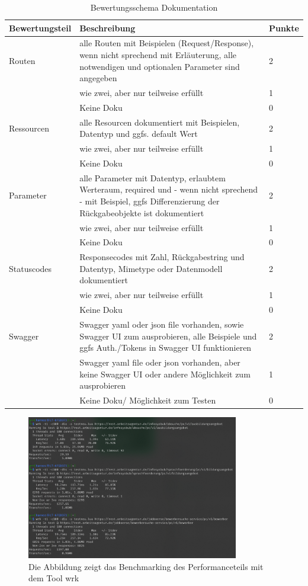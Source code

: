 \documentclass[notitlepage, hidelinks]{article}
\begin{document}
\begin{table}[H]
\begin{center}
\begin{tabular}{|p{3.6cm}|p{8.5cm}|p{2.5cm}|}
\hline
\textbf{Bewertungsteil} & \textbf{Beschreibung} & \textbf{Punkte}\\ \hline
Routen & alle Routen mit Beispielen (Request/Response), wenn nicht sprechend mit Erläuterung, alle notwendigen und optionalen Parameter sind angegeben & 2 \\ \hline
& wie zwei, aber nur teilweise erfüllt & 1 \\ \hline
& Keine Doku & 0 \\ \hline
Ressourcen & alle Resourcen dokumentiert mit Beispielen, Datentyp und ggfs. default Wert & 2 \\ \hline
& wie zwei, aber nur teilweise erfüllt & 1 \\ \hline
& Keine Doku & 0 \\ \hline
Parameter & alle Parameter mit Datentyp, erlaubtem Werteraum, required und - wenn nicht sprechend - mit Beispiel, ggfs Differenzierung der Rückgabeobjekte ist dokumentiert & 2 \\ \hline
& wie zwei, aber nur teilweise erfüllt & 1 \\ \hline
& Keine Doku & 0 \\ \hline
Statuscodes & Responsecodes mit Zahl, Rückgabestring und Datentyp, Mimetype oder Datenmodell dokumentiert & 2 \\ \hline
& wie zwei, aber nur teilweise erfüllt & 1 \\ \hline
& Keine Doku & 0 \\ \hline
Swagger & Swagger yaml oder json file vorhanden, sowie Swagger UI zum ausprobieren, alle Beispiele und ggfs Auth./Tokens in Swagger UI funktionieren & 2 \\ \hline
& Swagger yaml file oder json vorhanden, aber keine Swagger UI oder andere Möglichkeit zum ausprobieren & 1 \\ \hline
& Keine Doku/ Möglichkeit zum Testen & 0 \\ \hline
\end{tabular}
\caption{Bewertungsschema Dokumentation}
\label{documentation}
\end{center}
\end{table}


\begin{figure}[H]
\centering
  \includegraphics[width=350px]{images/apisbenchmarking.png}
  \caption{Die Abbildung zeigt das Benchmarking des Performanceteils mit dem Tool wrk}
  \label{apisbenchmarking}
\end{figure}
\end{document}
